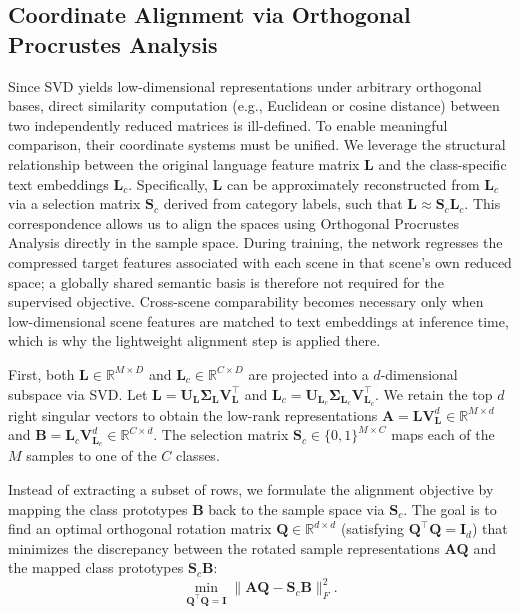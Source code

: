 \subsection{Coordinate Alignment via Orthogonal Procrustes Analysis}
\label{subsec:OPA}
Since SVD yields low-dimensional representations under arbitrary orthogonal bases, direct similarity computation (e.g., Euclidean or cosine distance) between two independently reduced matrices is ill-defined. To enable meaningful comparison, their coordinate systems must be unified. We leverage the structural relationship between the original language feature matrix $\mathbf{L}$ and the class-specific text embeddings $\mathbf{L}_c$. Specifically, $\mathbf{L}$ can be approximately reconstructed from $\mathbf{L}_c$ via a selection matrix $\mathbf{S}_c$ derived from category labels, such that $\mathbf{L} \approx \mathbf{S}_c \mathbf{L}_c$. This correspondence allows us to align the spaces using Orthogonal Procrustes Analysis directly in the sample space. During training, the network regresses the compressed target features associated with each scene in that scene's own reduced space; a globally shared semantic basis is therefore not required for the supervised objective. Cross-scene comparability becomes necessary only when low-dimensional scene features are matched to text embeddings at inference time, which is why the lightweight alignment step is applied there.

First, both $\mathbf{L} \in \mathbb{R}^{M \times D}$ and $\mathbf{L}_c \in \mathbb{R}^{C \times D}$ are projected into a $d$-dimensional subspace via SVD. Let $\mathbf{L} = \mathbf{U}_\mathbf{L} \mathbf{\Sigma}_\mathbf{L} \mathbf{V}_{\mathbf{L}}^\top$ and $\mathbf{L}_c = \mathbf{U}_{\mathbf{L}_c} \mathbf{\Sigma}_{\mathbf{L}_c} \mathbf{V}_{\mathbf{L}_c}^\top$. We retain the top $d$ right singular vectors to obtain the low-rank representations $\mathbf{A} = \mathbf{L} \mathbf{V}_{\mathbf{L}}^d \in \mathbb{R}^{M \times d}$ and $\mathbf{B} = \mathbf{L}_c \mathbf{V}_{\mathbf{L}_c}^d \in \mathbb{R}^{C \times d}$. The selection matrix $\mathbf{S}_c \in \{0,1\}^{M \times C}$ maps each of the $M$ samples to one of the $C$ classes. 

Instead of extracting a subset of rows, we formulate the alignment objective by mapping the class prototypes $\mathbf{B}$ back to the sample space via $\mathbf{S}_c$. The goal is to find an optimal orthogonal rotation matrix $\mathbf{Q} \in \mathbb{R}^{d \times d}$ (satisfying $\mathbf{Q}^\top \mathbf{Q} = \mathbf{I}_d$) that minimizes the discrepancy between the rotated sample representations $\mathbf{A}\mathbf{Q}$ and the mapped class prototypes $\mathbf{S}_c \mathbf{B}$:
\begin{equation}
    \min_{\mathbf{Q}^\top \mathbf{Q} = \mathbf{I}} \| \mathbf{A} \mathbf{Q} - \mathbf{S}_c \mathbf{B} \|_F^2.
    \label{eq:procrustes_sample_space}
\end{equation}

